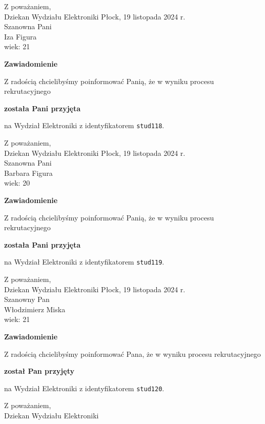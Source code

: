 \documentclass[12pt,a4paper]{article}
\begin{document}
\noindent
Z poważaniem,\\
Dziekan
Wydziału Elektroniki
\newpage
\hfill Płock, 19 listopada 2024 r.\\ 
\noindent 
Szanowna Pani \\
Iza Figura \\
wiek: 21

\bigskip

\begin{center}
{\Large\textbf{Zawiadomienie}}
\end{center}
\bigskip
Z radością chcielibyśmy poinformować Panią, że w wyniku procesu rekrutacyjnego
\begin{center}
\textsf{\textbf{została Pani przyjęta}} 
\end{center}
na Wydział Elektroniki z identyfikatorem \verb|stud118|.
\vspace{2cm}

\noindent
Z poważaniem,\\
Dziekan
Wydziału Elektroniki
\newpage
\hfill Płock, 19 listopada 2024 r.\\ 
\noindent 
Szanowna Pani \\
Barbara Figura \\
wiek: 20

\bigskip

\begin{center}
{\Large\textbf{Zawiadomienie}}
\end{center}
\bigskip
Z radością chcielibyśmy poinformować Panią, że w wyniku procesu rekrutacyjnego
\begin{center}
\textsf{\textbf{została Pani przyjęta}} 
\end{center}
na Wydział Elektroniki z identyfikatorem \verb|stud119|.
\vspace{2cm}

\noindent
Z poważaniem,\\
Dziekan
Wydziału Elektroniki
\newpage
\hfill Płock, 19 listopada 2024 r.\\ 
\noindent 
Szanowny Pan \\
Włodzimierz Miska \\
wiek: 21

\bigskip

\begin{center}
{\Large\textbf{Zawiadomienie}}
\end{center}
\bigskip
Z radością chcielibyśmy poinformować Pana, że w wyniku procesu rekrutacyjnego
\begin{center}
\textsf{\textbf{został Pan przyjęty}} 
\end{center}
na Wydział Elektroniki z identyfikatorem \verb|stud120|.
\vspace{2cm}

\noindent
Z poważaniem,\\
Dziekan
Wydziału Elektroniki
\newpage
\end{document}
